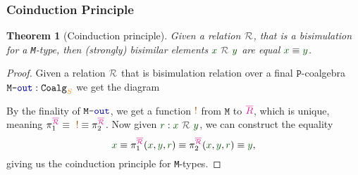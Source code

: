 \documentclass[xelatex,mathserif,serif,notheorems]{beamer} %
\theoremstyle{plain} %
\newtheorem{thm}{Theorem}[section]
\theoremstyle{definition}
\theoremstyle{remark}
\newcommand*{\term}[1]{\textcolor{green!30!black}{#1}} %
\newcommand*{\type}[1]{\textcolor{magenta!90!black}{#1}}
\newcommand*{\container}[1]{\textcolor{orange}{#1}}
\newcommand*{\coalg}[2]{#1\texttt{-}#2}
\newcommand*{\relation}[1]{\textcolor{gray!75!black}{\ensuremath{\mathtt{#1}}}}
\newcommand*{\constant}[1]{\textcolor{orange!60!black}{\ensuremath{\mathtt{#1}}}}
\newcommand*{\function}[1]{\textcolor{blue!60!black}{\ensuremath{\mathtt{#1}}}}
\newcommand*{\typeformer}[1]{\ensuremath{\mathtt{#1}}}
\newcommand*{\functor}[1]{\ensuremath{\mathbf{\mathtt{#1}}}}
\newcommand{\setlengths}{
  \setlength{\abovedisplayskip}{4pt}
  \setlength{\belowdisplayskip}{4pt}
  \setlength{\abovedisplayshortskip}{2pt}
  \setlength{\belowdisplayshortskip}{2pt}
}
\begin{document}
\begin{frame}[fragile]
  \frametitle{Coinduction Principle}
  \begin{thm}[Coinduction principle]\setlengths
    Given a relation \(\relation{\mathcal{R}}\), that is a bisimulation for a \texttt{M}-type, then (strongly) bisimilar elements \(\term{x}~\relation{\mathcal{R}}~\term{y}\) are equal \(\term{x} \equiv \term{y}\).
  \end{thm}
  \begin{proof}\setlengths
    Given a relation \(\relation{\mathcal{R}}\) that is bisimulation relation over a final \(\functor{P}\)-coalgebra \(\coalg{\typeformer{M}}{\function{out}}:\mathtt{Coalg}_{\container{S}}\) we get the diagram
    \begin{figure}[h]
      \centering
    \end{figure}
    By the finality of \(\coalg{\typeformer{M}}{\function{out}}\), we get a function \(\constant{!}\) from \(\typeformer{M}\) to \(\type{\overline{R}}\), which is unique, meaning \(\pi_1^{\type{\overline{\mathcal{R}}}} \equiv ~\constant{!} \equiv \pi_2^{\type{\overline{\mathcal{R}}}}\). Now given \(\term{r} : \term{x}~\relation{\mathcal{R}}~\term{y}\), we can construct the equality
    \begin{equation}
      \term{x} \equiv \pi_1^{\type{\overline{\mathcal{R}}}} (\term{x}, \term{y}, \term{r}) \equiv \pi_2^{\type{\overline{\mathcal{R}}}} (\term{x}, \term{y}, \term{r}) \equiv \term{y},
    \end{equation}
    giving us the coinduction principle for \texttt{M}-types.
  \end{proof}  
\end{frame}
\end{document}
